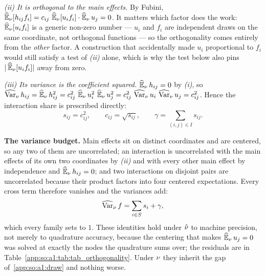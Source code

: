 \emph{(ii) It is orthogonal to the main effects.} By Fubini,
$\operatorname{\widehat{\mathbb{E}}}_\nu[h_{ij}f_i]=c_{ij}\,\operatorname{\widehat{\mathbb{E}}}_\nu[u_i f_i]\cdot\operatorname{\widehat{\mathbb{E}}}_\nu u_j=0$. It matters which
factor does the work: $\operatorname{\widehat{\mathbb{E}}}_\nu[u_i f_i]$ is a generic non-zero number --- $u_i$
and $f_i$ are independent draws on the same coordinate, not orthogonal
functions --- so the orthogonality comes entirely from the \emph{other}
factor. A construction that accidentally made $u_i$ proportional to $f_i$
would still satisfy a test of \emph{(ii)} alone, which is why the test below
also pins $|\operatorname{\widehat{\mathbb{E}}}_\nu[u_i f_i]|$ away from zero.

\emph{(iii) Its variance is the coefficient squared.} $\operatorname{\widehat{\mathbb{E}}}_\nu h_{ij}=0$ by
\emph{(i)}, so $\operatorname{\widehat{\mathrm{Var}}}_\nu h_{ij}=\operatorname{\widehat{\mathbb{E}}}_\nu h_{ij}^2=c_{ij}^2\,\operatorname{\widehat{\mathbb{E}}}_\nu u_i^2\,\operatorname{\widehat{\mathbb{E}}}_\nu
u_j^2 =c_{ij}^2\,\operatorname{\widehat{\mathrm{Var}}}_\nu u_i\,\operatorname{\widehat{\mathrm{Var}}}_\nu u_j=c_{ij}^2$. Hence the interaction
share is prescribed directly:
\begin{equation}\label{app:so:a1:eq:hshare}
  s_{ij}=c_{ij}^2,
  \qquad c_{ij}=\sqrt{s_{ij}},
  \qquad \gamma=\sum_{(i,j)\in I}s_{ij}.
\end{equation}

\textbf{The variance budget.} Main effects sit on distinct coordinates and are
centered, so any two of them are uncorrelated; an interaction is uncorrelated
with the main effects of its own two coordinates by \emph{(ii)} and with every
other main effect by independence and $\operatorname{\widehat{\mathbb{E}}}_\nu h_{ij}=0$; and two interactions
on disjoint pairs are uncorrelated because their product factors into four
centered expectations. Every cross term therefore vanishes and the variances
add:
\begin{equation}\label{app:so:a1:eq:budget}
  \operatorname{\widehat{\mathrm{Var}}}_\nu f=\sum_{i\in S}s_i+\gamma,
\end{equation}
which every family sets to $1$. These identities hold under $\hat\nu$ to
machine precision, not merely to quadrature accuracy, because the centering
that makes $\operatorname{\widehat{\mathbb{E}}}_\nu u_j=0$ was solved at exactly the nodes the quadrature sums
over; the residuals are in Table~\ref{app:so:a1:tab:tab_orthogonality}. Under
$\nu$ they inherit the gap of~\ref{app:so:a1:draw} and nothing worse.

\begin{table}[htbp]
  \centering
  \caption[Product-interaction orthogonality residuals]{
  The three identities \emph{(i)}--\emph{(iii)} as residuals, over
  every interaction block with a non-zero coefficient on the archived grid
  (seeds $0$--$9$, $D=\SOnumStudyD$). $\Varhat h$ is formed from the block's own
  $64\times64$ node values rather than from ,
  which is the algebraic factorization \emph{(iii)} itself and so could not
  test it.}\label{app:so:a1:tab:tab_orthogonality}
  \small\setlength{\tabcolsep}{3pt}
  
\end{table}

